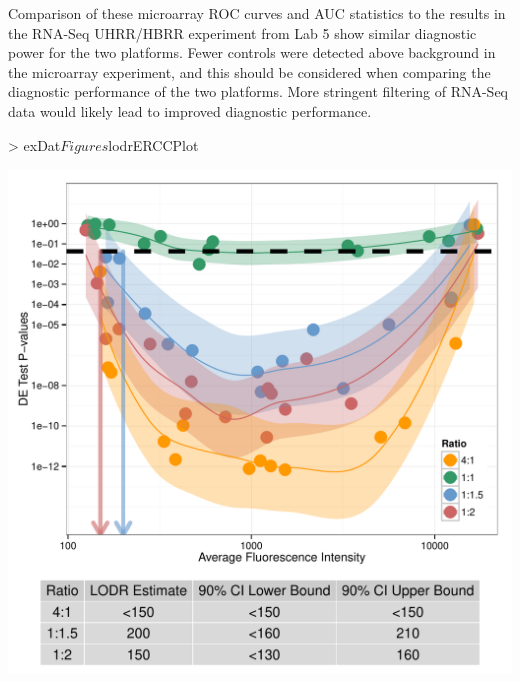 \documentclass{article}
\begin{document}
Comparison of these microarray ROC curves and AUC statistics to the results in the RNA-Seq 
UHRR/HBRR experiment from Lab 5 show similar diagnostic power 
for the two platforms. Fewer controls were detected above background in the microarray experiment, and this should be considered when comparing the diagnostic performance
of the two platforms. More stringent filtering of RNA-Seq data would likely lead to improved diagnostic
performance.
\clearpage
\begin{center}
\begin{Schunk}
\begin{Sinput}
> exDat$Figures$lodrERCCPlot
\end{Sinput}
\end{Schunk}
\includegraphics{erccdashboardVignette-seqcArrayPlotC}
\end{center}
\end{document}
